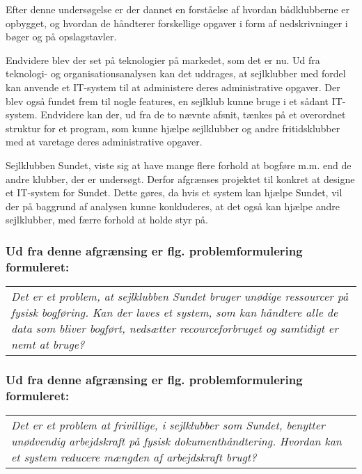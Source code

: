 Efter denne undersøgelse er der dannet en forståelse af hvordan bådklubberne er opbygget, og hvordan de håndterer
forskellige opgaver i form af nedskrivninger i bøger og på opslagstavler.

Endvidere blev der set på teknologier på markedet, som det er nu. Ud fra teknologi- og organisationsanalysen kan det
uddrages, at sejlklubber med fordel kan anvende et IT-system til at administere deres administrative opgaver. Der blev
også fundet frem til nogle features, en sejlklub kunne bruge i et sådant IT-system. Endvidere kan der, ud fra de to
nævnte afsnit, tænkes på et overordnet struktur for et program, som kunne hjælpe sejlklubber og andre fritidsklubber med
at varetage deres administrative opgaver.

Sejlklubben Sundet, viste sig at have mange flere forhold at bogføre m.m. end de andre klubber, der er undersøgt. Derfor afgrænses projektet til konkret at designe et IT-system for Sundet. Dette gøres, da hvis et system kan hjælpe Sundet, vil der på baggrund af analysen kunne konkluderes, at det også kan hjælpe andre sejlklubber, med færre forhold at holde styr på. 

\subsubsection*{Ud fra denne afgrænsing er flg. problemformulering formuleret:}
\begin{center}
\begin{tabular}{|p{14cm}|}
\textit{Det er et problem, at sejlklubben Sundet bruger unødige ressourcer på fysisk bogføring. Kan der laves et system, som kan håndtere alle de data som bliver bogført, nedsætter recourceforbruget og samtidigt er nemt at bruge? }
\end{tabular}
\end{center}
\subsubsection*{Ud fra denne afgrænsing er flg. problemformulering formuleret:}
\begin{center}
\begin{tabular}{|p{14cm}|}
\textit{Det er et problem at frivillige, i sejlklubber som Sundet, benytter unødvendig arbejdskraft på fysisk dokumenthåndtering. Hvordan kan et system reducere mængden af arbejdskraft brugt? }
\end{tabular}
\end{center}

